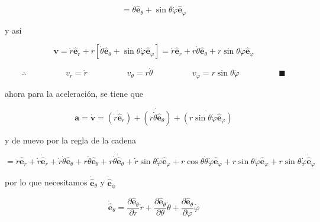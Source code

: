 \documentclass[12pt,a4paper]{article}
\begin{document}
\begin{enumerate}
     \begin{equation*}
         = \dot{\theta} \hat{\mathbf{e}}_\theta + \sin{\theta} \dot{\varphi} \hat{\mathbf{e}}_\varphi
     \end{equation*}
     
     y así
     
     \begin{equation*}
         \mathbf{v} = \dot{r} \mathbf{\hat{e}}_r + r [\dot{\theta} \hat{\mathbf{e}}_\theta + \sin{\theta} \dot{\varphi} \hat{\mathbf{e}}_\varphi] = \dot{r} \mathbf{\hat{e}}_r + r \dot{\theta} \hat{\mathbf{e}}_\theta + r \sin{\theta} \dot{\varphi} \hat{\mathbf{e}}_\varphi
     \end{equation*}
     
     \begin{equation*}
         \therefore \hspace{2cm} v_r = \dot{r} \hspace{2cm} v_\theta = r \dot{\theta} \hspace{2cm} v_\varphi = r \sin{\theta} \dot{\varphi} \hspace{2cm} \blacksquare
      \end{equation*}
      
      ahora para la aceleración, se tiene que
      
      \begin{equation*}
          \mathbf{a} = \dot{\mathbf{v}}= \dot{(\dot{r}\mathbf{\hat{e}}_r)} + \dot{(r\dot{\theta} \mathbf{\hat{e}}_\theta)} + \dot{(r\sin{\theta} \dot{\varphi}\mathbf{\hat{e}}_\varphi)}
      \end{equation*}
      
      y de nuevo por la regla de la cadena
      
      \begin{equation*}
          = \ddot{r}\mathbf{\hat{e}}_r + \dot{r}\mathbf{\dot{\hat{e}}}_r + \dot{r} \dot{\theta} \mathbf{\hat{e}}_\theta + r \ddot{\theta} \mathbf{\hat{e}}_\theta + r \dot{\theta} \dot{\mathbf{\hat{e}}}_\theta + \dot{r}\sin{\theta}\dot{\varphi}\mathbf{\hat{e}}_\varphi+ r \cos{\theta} \dot{\theta} \dot{\varphi} \mathbf{\hat{e}}_\varphi + r \sin{\theta} \ddot{\varphi} \mathbf{\hat{e}}_\varphi + r \sin{\theta} \dot{\varphi} \dot{\mathbf{\hat{e}}}_\varphi
      \end{equation*}
      
      por lo que necesitamos $\dot{\mathbf{\hat{e}}}_\theta$ y $\dot{\mathbf{\hat{e}}}_\phi$
      
      \begin{equation*}
          \dot{\mathbf{\hat{e}}}_\theta = \frac{\partial \hat{\mathbf{e}}_\theta}{\partial r} \dot{r} + \frac{\partial \hat{\mathbf{e}}_\theta}{\partial \theta} \dot{\theta} + \frac{\partial \hat{\mathbf{e}}_\theta}{\partial \varphi} \dot{\varphi}
      \end{equation*}
      

\end{enumerate}
\end{document}
